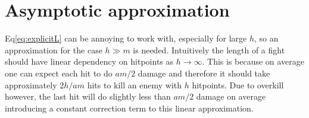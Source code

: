 \section{Asymptotic approximation}
Eq\ref{eq:explicitL} can be annoying to work with, especially for large $h$, so an approximation for the case $h \gg m$ is needed. Intuitively the length of a fight should have linear dependency on hitpoints as $h \rightarrow \infty$. This is because on average one can expect each hit to do $am/2$ damage and therefore it should take approximately $2h/am$ hits to kill an enemy with $h$ hitpoints. Due to overkill however, the last hit will do slightly less than $am/2$ damage on average introducing a constant correction term to this linear approximation.
